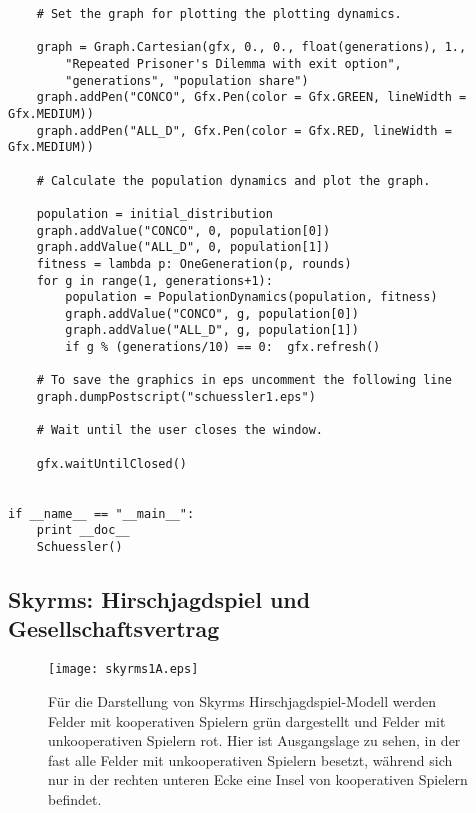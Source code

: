 \documentclass[12pt,a4paper,ngerman]{article}
\begin{document}
\begin{scriptsize}
\begin{verbatim}
    # Set the graph for plotting the plotting dynamics.

    graph = Graph.Cartesian(gfx, 0., 0., float(generations), 1.,
        "Repeated Prisoner's Dilemma with exit option",
        "generations", "population share")
    graph.addPen("CONCO", Gfx.Pen(color = Gfx.GREEN, lineWidth = Gfx.MEDIUM))
    graph.addPen("ALL_D", Gfx.Pen(color = Gfx.RED, lineWidth = Gfx.MEDIUM))

    # Calculate the population dynamics and plot the graph.

    population = initial_distribution
    graph.addValue("CONCO", 0, population[0])
    graph.addValue("ALL_D", 0, population[1])
    fitness = lambda p: OneGeneration(p, rounds)
    for g in range(1, generations+1):
        population = PopulationDynamics(population, fitness)
        graph.addValue("CONCO", g, population[0])
        graph.addValue("ALL_D", g, population[1])         
        if g % (generations/10) == 0:  gfx.refresh()

    # To save the graphics in eps uncomment the following line
    graph.dumpPostscript("schuessler1.eps")

    # Wait until the user closes the window.

    gfx.waitUntilClosed()
    

if __name__ == "__main__":
    print __doc__
    Schuessler()

\end{verbatim}
\end{scriptsize}

\newpage

\subsection{Skyrms: Hirschjagdspiel und Gesellschaftsvertrag}
\label{Beispiele_Skyrms}

\begin{figure}
\begin{center}
\texttt{[image: skyrms1A.eps]}
\caption{\label{skyrms1A} Für die Darstellung von Skyrms
  Hirschjagdspiel-Modell \cite{skyrms:2004} werden Felder mit
  kooperativen Spielern grün dargestellt und Felder mit unkooperativen
  Spielern rot. Hier ist Ausgangslage zu sehen, in der fast alle
  Felder mit unkooperativen Spielern besetzt, während sich nur in der
  rechten unteren Ecke eine Insel von kooperativen Spielern befindet.}
\end{center}
\end{figure}
\end{document}
